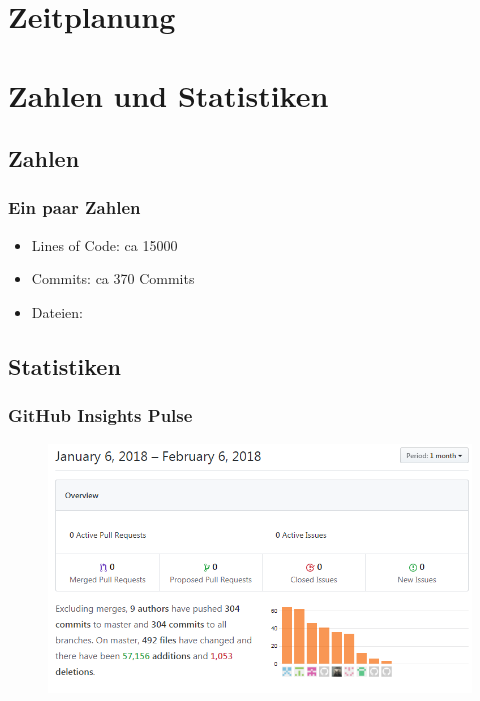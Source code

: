 \documentclass[11pt, usepdftitle=false,...]{beamer}
\begin{document}
	\section{Zeitplanung}
	\frame{\sectionpage}
	
	\section{Zahlen und Statistiken}
	\frame{\sectionpage}
	
		\subsection{Zahlen}
		\frame{\subsectionpage}
			\begin{frame}
				\frametitle{Ein paar Zahlen}
				\begin{itemize}
					\item Lines of Code: ca 15000
					\item Commits: ca 370 Commits
					\item Dateien:					
				\end{itemize}	
			\end{frame}
			
		\subsection{Statistiken}
		\frame{\subsectionpage}
		
			\begin{frame}
				\frametitle{GitHub Insights Pulse}
				\begin{figure}[ht] 
					\centering
					\includegraphics[scale=0.50, trim= 1cm 0 0 0]{pulse.png}
					\label{fig1}
				\end{figure}
			\end{frame}	
		
\end{document}

